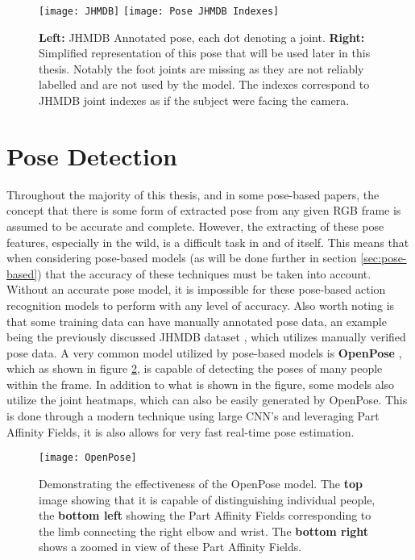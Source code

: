 \begin{figure}[h]
	\texttt{[image: JHMDB]}
	\texttt{[image: Pose JHMDB Indexes]}
	\centering
	\caption{\textbf{Left:} JHMDB Annotated pose, each dot denoting a joint. \textbf{Right:} Simplified representation of this pose that will be used later in this thesis. Notably the foot joints are missing as they are not reliably labelled and are not used by the model. The indexes correspond to JHMDB joint indexes as if the subject were facing the camera.}
	\label{fig:JHMDB}
\end{figure}

\section{Pose Detection}
\label{sec:pose-detection}

Throughout the majority of this thesis, and in some pose-based papers, the concept that there is some form of extracted pose from any given RGB frame is assumed to be accurate and complete. However, the extracting of these pose features, especially in the wild, is a difficult task in and of itself. This means that when considering pose-based models (as will be done further in section \ref{sec:pose-based}) that the accuracy of these techniques must be taken into account. Without an accurate pose model, it is impossible for these pose-based action recognition models to perform with any level of accuracy. Also worth noting is that some training data can have manually annotated pose data, an example being the previously discussed JHMDB dataset \cite{JHMDB}, which utilizes manually verified pose data. A very common model utilized by pose-based models is \textbf{OpenPose} \cite{openpose}, which as shown in figure \ref{fig:openpose}, is capable of detecting the poses of many people within the frame. In addition to what is shown in the figure, some models also utilize the joint heatmaps, which can also be easily generated by OpenPose. This is done through a modern technique using large CNN's and leveraging Part Affinity Fields, it is also allows for very fast real-time pose estimation.

\begin{figure}[h]
	\texttt{[image: OpenPose]}
	\centering
	\caption{Demonstrating the effectiveness of the OpenPose \cite{openpose} model. The \textbf{top} image showing that it is capable of distinguishing individual people, the \textbf{bottom left} showing the Part Affinity Fields corresponding to the limb connecting the right elbow and wrist. The \textbf{bottom right} shows a zoomed in view of these Part Affinity Fields.}
	\label{fig:openpose}
\end{figure}

